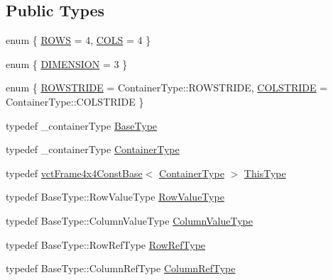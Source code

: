 \subsection*{Public Types}
\begin{DoxyCompactItemize}
\item 
enum \{ \hyperlink{classvct_frame4x4_const_base_a59489f9af452566ab1c64e8bdd773816a0bf380abb894ab8d6cba2c741fdef509}{R\+O\+W\+S} = 4, 
\hyperlink{classvct_frame4x4_const_base_a59489f9af452566ab1c64e8bdd773816a9cb20cd587381139ae46de3761a04fcd}{C\+O\+L\+S} = 4
 \}
\item 
enum \{ \hyperlink{classvct_frame4x4_const_base_aa9000d4539e9ab27b091692d4bd0d986a97d7212e6c46dc9acbbd11bbc573d9a0}{D\+I\+M\+E\+N\+S\+I\+O\+N} = 3
 \}
\item 
enum \{ \hyperlink{classvct_frame4x4_const_base_a42bd2679548bfbb62bdca7f3a84c11fda381a64d4c14fac22ed91dcce4141d39d}{R\+O\+W\+S\+T\+R\+I\+D\+E} = Container\+Type\+:\+:R\+O\+W\+S\+T\+R\+I\+D\+E, 
\hyperlink{classvct_frame4x4_const_base_a42bd2679548bfbb62bdca7f3a84c11fdac3f81140627afba5e58cb14bd1a4e648}{C\+O\+L\+S\+T\+R\+I\+D\+E} = Container\+Type\+:\+:C\+O\+L\+S\+T\+R\+I\+D\+E
 \}
\item 
typedef \+\_\+container\+Type \hyperlink{classvct_frame4x4_const_base_a586ce8ad04a54639cc8967a17fb3cd36}{Base\+Type}
\item 
typedef \+\_\+container\+Type \hyperlink{classvct_frame4x4_const_base_ac8b3e3540ee9e065a519d7b364276662}{Container\+Type}
\item 
typedef \hyperlink{classvct_frame4x4_const_base}{vct\+Frame4x4\+Const\+Base}$<$ \hyperlink{classvct_frame4x4_const_base_ac8b3e3540ee9e065a519d7b364276662}{Container\+Type} $>$ \hyperlink{classvct_frame4x4_const_base_acb37107e49c20bd15139ff196aff1087}{This\+Type}
\item 
typedef Base\+Type\+::\+Row\+Value\+Type \hyperlink{classvct_frame4x4_const_base_aa63c7449b3c8248ec0d2e852d2389ae9}{Row\+Value\+Type}
\item 
typedef Base\+Type\+::\+Column\+Value\+Type \hyperlink{classvct_frame4x4_const_base_a72db1f941fd40f1252409297c3dd0ff6}{Column\+Value\+Type}
\item 
typedef Base\+Type\+::\+Row\+Ref\+Type \hyperlink{classvct_frame4x4_const_base_a4032e45bc1de2cf3ef9436aef57f1595}{Row\+Ref\+Type}
\item 
typedef Base\+Type\+::\+Column\+Ref\+Type \hyperlink{classvct_frame4x4_const_base_aa62cf0655339f6cbbe4c0b4323fe8dcf}{Column\+Ref\+Type}
\item 

\end{DoxyCompactItemize}
